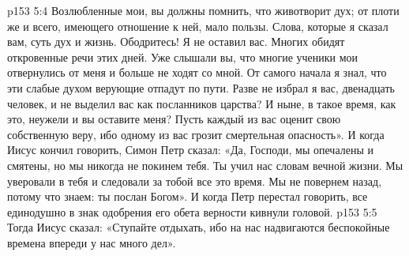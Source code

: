 \vs p153 5:4 Возлюбленные мои, вы должны помнить, что животворит дух; от плоти же и всего, имеющего отношение к ней, мало пользы. Слова, которые я сказал вам, суть дух и жизнь. Ободритесь! Я не оставил вас. Многих обидят откровенные речи этих дней. Уже слышали вы, что многие ученики мои отвернулись от меня и больше не ходят со мной. От самого начала я знал, что эти слабые духом верующие отпадут по пути. Разве не избрал я вас, двенадцать человек, и не выделил вас как посланников царства? И ныне, в такое время, как это, неужели и вы оставите меня? Пусть каждый из вас оценит свою собственную веру, ибо одному из вас грозит смертельная опасность». И когда Иисус кончил говорить, Симон Петр сказал: «Да, Господи, мы опечалены и смятены, но мы никогда не покинем тебя. Ты учил нас словам вечной жизни. Мы уверовали в тебя и следовали за тобой все это время. Мы не повернем назад, потому что знаем: ты послан Богом». И когда Петр перестал говорить, все единодушно в знак одобрения его обета верности кивнули головой.
\vs p153 5:5 Тогда Иисус сказал: «Ступайте отдыхать, ибо на нас надвигаются беспокойные времена впереди у нас много дел».
